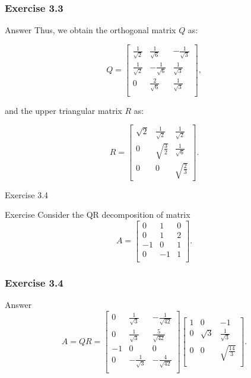 \documentclass{beamer}
\begin{document}
\begin{frame}
    \frametitle{Exercise 3.3}
    \begin{block}{Answer}
        Thus, we obtain the orthogonal matrix \( Q \) as:

\[
Q = \begin{bmatrix}
\frac{1}{\sqrt{2}} & \frac{1}{\sqrt{6}} & -\frac{1}{\sqrt{3}} \\
\frac{1}{\sqrt{2}} & -\frac{1}{\sqrt{6}} & \frac{1}{\sqrt{3}} \\
0 & \frac{2}{\sqrt{6}} & \frac{1}{\sqrt{3}} \\
\end{bmatrix},
\]

and the upper triangular matrix \( R \) as:

\[
R = \begin{bmatrix}
\sqrt{2} & \frac{1}{\sqrt{2}} & \frac{1}{\sqrt{2}} \\
0 & \sqrt{\frac{3}{2}} & \frac{1}{\sqrt{6}} \\
0 & 0 & \sqrt{\frac{2}{3}}
\end{bmatrix}.
\]
    \end{block}
\end{frame}

\begin{frame}{Exercise 3.4}
    \begin{block}{Exercise}
        Consider the QR decomposition of matrix
\[
A = \begin{bmatrix}
0 & 1 & 0 \\
0 & 1 & 2 \\
-1 & 0 & 1 \\
0 & -1 & 1 \\
\end{bmatrix}.
\]
    \end{block}
\end{frame}

\begin{frame}
    \frametitle{Exercise 3.4}
    \begin{block}{Answer}
        $$A=QR= \begin{bmatrix}
0 & \frac{1}{\sqrt{3}} & -\frac{1}{\sqrt{42}} \\
0 & \frac{1}{\sqrt{3}} & \frac{5}{\sqrt{42}} \\
-1 & 0 & 0 \\
0 & -\frac{1}{\sqrt{3}} & -\frac{4}{\sqrt{42}} \\
\end{bmatrix}
\begin{bmatrix}
1 & 0 & -1 \\
0 & \sqrt{3} & \frac{1}{\sqrt{3}} \\
0 & 0 & \sqrt{\frac{14}{3}} \\
\end{bmatrix}
.
$$
    \end{block}
    
\end{frame}
\end{document}
